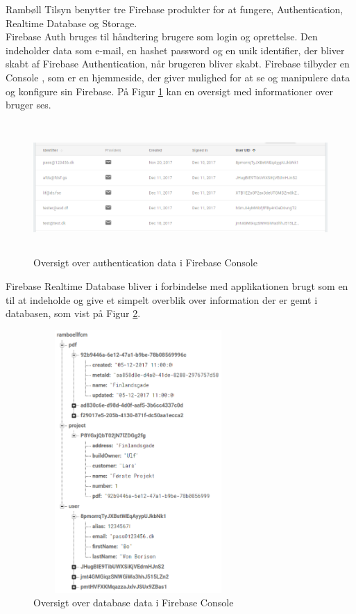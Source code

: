 Rambøll Tilsyn benytter tre Firebase produkter for at fungere, Authentication, Realtime Database og Storage.\\

 Firebase Auth\cite{FirebaseAuth} bruges til håndtering brugere som login og oprettelse. Den indeholder data som e-mail, en hashet password og en unik identifier, der bliver skabt af Firebase Authentication, når brugeren bliver skabt. Firebase tilbyder en Console , som er en hjemmeside, der giver mulighed for at se og manipulere data og konfigure sin Firebase. På Figur \ref{fig:FirebaseAuthPNG} kan en oversigt med informationer over bruger ses. 
\begin{figure}[H] %
	\centering
	\includegraphics[height=5cm, width=15cm]{../ArkitekturDesign/Design/Firebase/FirebaseAuth.PNG}
	\caption{Oversigt over authentication data i Firebase Console}
	\label{fig:FirebaseAuthPNG}
\end{figure}

Firebase Realtime Database bliver i forbindelse med applikationen brugt som en til at indeholde og give et simpelt overblik over information der er gemt i databasen, som vist på Figur \ref{fig:FirebaseDBPNG}.  
 
\begin{figure}[H] %
	\centering
	\includegraphics[height=10cm, width=8cm]{../ArkitekturDesign/Design/Firebase/FirebaseDB.PNG}
	\caption{Oversigt over database data i Firebase Console}
	\label{fig:FirebaseDBPNG}
\end{figure}

